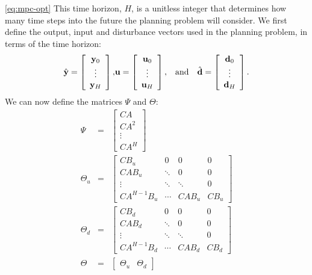 \autoref{eq:mpc-opt}
This time horizon, $H$, is a unitless integer that determines how many time steps into the future the planning problem will consider.
We first define the output, input and disturbance vectors used in the planning problem, in terms of the time horizon:
\begin{eqnarray}
   \label{eq:mpc-vectors}
   \hat{\mathbf{y}} = \left[\begin{array}{c}
      \mathbf{y}_0 \\
      \vdots \\
      \mathbf{y}_H
   \end{array}\right],
   &
   \mathbf{u} = \left[\begin{array}{c}
      \mathbf{u}_0 \\
      \vdots \\
      \mathbf{u}_H
   \end{array}\right],
   & \text{and} \quad
   \hat{\mathbf{d}} = \left[\begin{array}{c}
      \mathbf{d}_0 \\
      \vdots \\
      \mathbf{d}_H
   \end{array}\right].
\end{eqnarray}
We can now define the matrices $\Psi$ and $\Theta$:
\begin{eqnarray}
   \label{eq:mpc-psi}
   \Psi &=& \left[\begin{array}{c}
      CA \\ CA^2 \\ \vdots \\ CA^H
   \end{array}\right]
   \\\label{eq:mpc-theta-u}
   \Theta_u &=& \left[\begin{array}{cccc}
      CB_u & 0 & 0 & 0 \\
      CAB_u & \ddots & 0 & 0 \\
      \vdots & \ddots & \ddots & 0 \\
      CA^{H-1}B_u & \cdots & CAB_u & CB_u
   \end{array}\right]
   \\\label{eq:mpc-theta-d}
   \Theta_d &=& \left[\begin{array}{cccc}
      CB_d & 0 & 0 & 0 \\
      CAB_d & \ddots & 0 & 0 \\
      \vdots & \ddots & \ddots & 0 \\
      CA^{H-1}B_d & \cdots & CAB_d & CB_d
   \end{array}\right]
   \\\label{eq:mpc-theta}
   \Theta &=& \left[\begin{array}{cc}
      \Theta_u & \Theta_d
   \end{array}\right]
\end{eqnarray}

